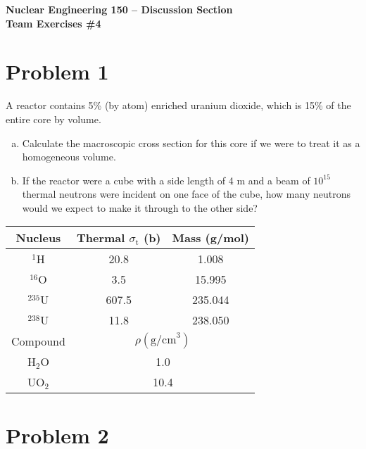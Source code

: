 \documentclass{report}
\begin{document}
\begin{center}
\textbf{\large Nuclear Engineering 150 -- Discussion Section}\\ 
\textbf{Team Exercises \#4}
\end{center}

\section*{Problem 1}

A reactor contains 5\% (by atom) enriched uranium dioxide, which is 15\% of the entire core by volume.
\begin{enumerate}[a)]
\item Calculate the macroscopic cross section for this core if we were to treat it as a homogeneous volume. 
\item If the reactor were a cube with a side length of 4 m and a beam of $10^{15}$ thermal neutrons were incident on one face of the cube, how many neutrons would we expect to make it through to the other side?
\end{enumerate}

\begin{table}[htbp]
	\centering
	\begin{tabular}{|c|c|c|}
			\hline
			Nucleus		& Thermal $\sigma_{\text{t}}$ (b) & Mass (g/mol) \\
			\hline
			$^{1}$H		&  20.8						& 1.008			\\
			$^{16}$O	&  3.5 						& 15.995		\\
			$^{235}$U	&  607.5 					& 235.044		\\
			$^{238}$U	&  11.8						& 238.050		\\
			\hline
			Compound	& \multicolumn{2}{|c|}{$\rho \left(\text{g/cm}^3\right)$}          \\
			\hline
			H$_2$O		& \multicolumn{2}{|c|}{1.0}      \\
			UO$_2$		& \multicolumn{2}{|c|}{10.4}	\\
			\hline
	\end{tabular}
	\label{tab:design-specs}
\end{table}



\newpage
\section*{Problem 2}
\end{document}
